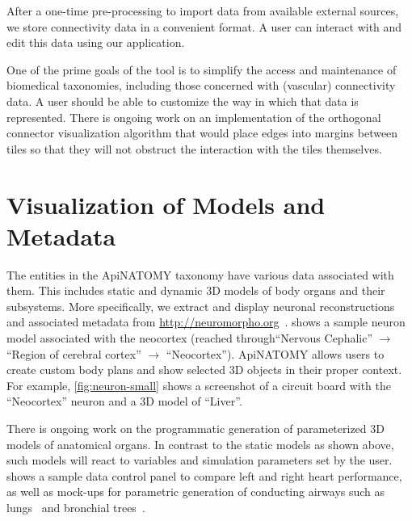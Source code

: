 After a one-time pre-processing to import data from available external sources, we store connectivity data in a convenient format. A user can interact with and edit this data using our application.

One of the prime goals of the tool is to simplify the access and maintenance of biomedical taxonomies, including those concerned with (vascular) connectivity data. A user should be able to customize the way in which that data is represented. There is ongoing work on an implementation of the orthogonal connector visualization algorithm that would place edges into margins between tiles so that they will not obstruct the interaction with the tiles themselves.


\section{Visualization of Models and Metadata} \label{sect:visualization2}               %

The entities in the ApiNATOMY taxonomy have various data associated with them. 
This includes static and dynamic 3D models of body organs and their subsystems. 
More specifically, we extract and display neuronal reconstructions and associated metadata from \url{http://neuromorpho.org}~\cite{Asc06}.
 shows a sample neuron model associated with the neocortex (reached through``Nervous Cephalic'' $\rightarrow$ ``Region of cerebral cortex'' $\rightarrow$ ``Neocortex''). ApiNATOMY allows users to create custom body plans and show selected 3D objects in their proper context. For example, \cref{fig:neuron-small} shows a screenshot of a circuit board with the ``Neocortex'' neuron and a 3D model of ``Liver''.

There is ongoing work on the programmatic generation of parameterized 3D models of anatomical organs. In contrast to the static models as shown above, such models will react to variables and simulation parameters set by the user.  shows a sample data control panel to compare left and right heart performance, as well as mock-ups for parametric generation of conducting airways such as lungs~\cite{TPH00} and bronchial trees~\cite{THT+04}.


